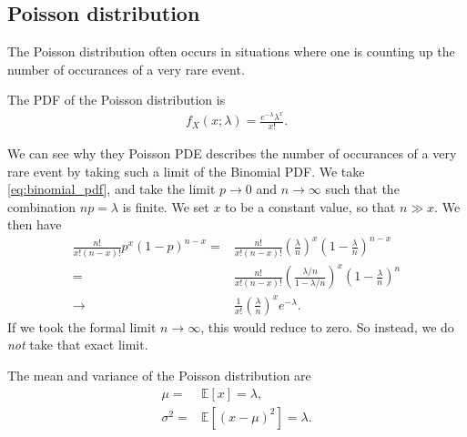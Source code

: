 \subsection{Poisson distribution}
The Poisson distribution often occurs in situations where one is counting up the number of occurances of a very rare event.

The PDF of the Poisson distribution is
\begin{align}
    \label{eq:poisson_pdf}
    f_X\left(x;\lambda\right)
    =
    \frac{e^{-\lambda}\lambda^x}{x!}
    .
\end{align}

We can see why they Poisson PDE describes the number of occurances of a very rare event by taking such a limit of the Binomial PDF.
We take \eqref{eq:binomial_pdf}, and take the limit $p\to0$ and $n\to\infty$ such that the combination $np=\lambda$ is finite.
We set $x$ to be a constant value, so that $n\gg x$.
We then have
\begin{align}
    \frac{n!}{x!\left(n-x\right)!} 
    p^x \left(1-p\right)^{n-x} 
    =&
    \frac{n!}{x!\left(n-x\right)!} \left(\frac{\lambda}{n}\right)^x \left(1-\frac{\lambda}{n}\right)^{n-x} 
    \nonumber\\
    =&
    \frac{n!}{x!\left(n-x\right)!} \left(\frac{\lambda/n}{1-\lambda/n}\right)^x \left(1-\frac{\lambda}{n}\right)^{n} 
    \nonumber\\
    \to&
    \frac{1}{x!}\left(\frac{\lambda}{n}\right)^xe^{-\lambda}
    .
\end{align}
If we took the formal limit $n\to\infty$, this would reduce to zero.
So instead, we do \emph{not} take that exact limit.

The mean and variance of the Poisson distribution are
\begin{align}
    \mu
    =&
    \mathbb{E}\left[x\right]
    =
    \lambda
    ,\\
    \sigma^2
    =&
    \mathbb{E}\left[\left(x-\mu\right)^2\right]
    =
    \lambda
    .
\end{align}
